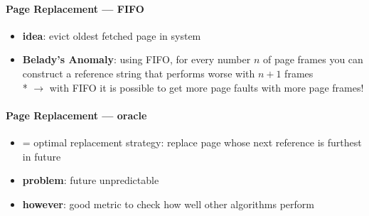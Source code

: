 \paragraph{Page Replacement --- FIFO}
\begin{itemize}
  \item \textbf{idea}: evict oldest fetched page in system
  \item \textbf{Belady's Anomaly}: using FIFO, for every number $ n $ of page frames you can construct a reference string that performs worse with $ n+1 $ frames \\*
  $ \to $ with FIFO it is possible to get more page faults with more page frames!
\end{itemize}

\paragraph{Page Replacement --- oracle}
\begin{itemize}
  \item = optimal replacement strategy: replace page whose next reference is furthest in future
  \item \textbf{problem}: future unpredictable
  \item \textbf{however}: good metric to check how well other algorithms perform
\end{itemize}

